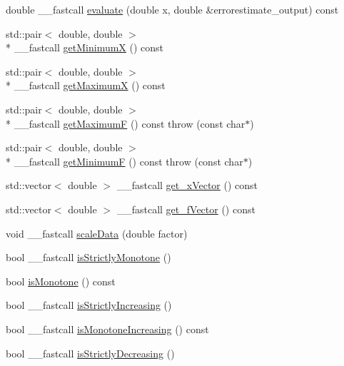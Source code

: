 \begin{DoxyCompactItemize}
\item 
double \+\_\+\+\_\+fastcall \hyperlink{class_monot_cubic_interpolator_aad63f86e674e25fbbaed04a556a80ef6}{evaluate} (double x, double \&errorestimate\+\_\+output) const 
\item 
std\+::pair$<$ double, double $>$\\*
 \+\_\+\+\_\+fastcall \hyperlink{class_monot_cubic_interpolator_a360e0936f3fb3aba30f04c3431dee583}{get\+Minimum\+X} () const 
\item 
std\+::pair$<$ double, double $>$\\*
 \+\_\+\+\_\+fastcall \hyperlink{class_monot_cubic_interpolator_a4f176fc0844759f53f0fbd34dcdd860f}{get\+Maximum\+X} () const 
\item 
std\+::pair$<$ double, double $>$\\*
 \+\_\+\+\_\+fastcall \hyperlink{class_monot_cubic_interpolator_a02050a8bda87e7d046373d672290e090}{get\+Maximum\+F} () const   throw (const char$\ast$)
\item 
std\+::pair$<$ double, double $>$\\*
 \+\_\+\+\_\+fastcall \hyperlink{class_monot_cubic_interpolator_abb3a4d7238087088fe520a6b61445983}{get\+Minimum\+F} () const   throw (const char$\ast$)
\item 
std\+::vector$<$ double $>$ \+\_\+\+\_\+fastcall \hyperlink{class_monot_cubic_interpolator_adb7f87b270ad93c8eb25a8bdbbe82344}{get\+\_\+x\+Vector} () const 
\item 
std\+::vector$<$ double $>$ \+\_\+\+\_\+fastcall \hyperlink{class_monot_cubic_interpolator_a60ae1a75018d1f92938681e78d4a1543}{get\+\_\+f\+Vector} () const 
\item 
void \+\_\+\+\_\+fastcall \hyperlink{class_monot_cubic_interpolator_a4050aca200ad7dfb4c7c34decb5f02fd}{scale\+Data} (double factor)
\item 
bool \+\_\+\+\_\+fastcall \hyperlink{class_monot_cubic_interpolator_a284ed1b74b2b6effae3077c48e90d1eb}{is\+Strictly\+Monotone} ()
\item 
bool \hyperlink{class_monot_cubic_interpolator_a9a403ebce5b791c191e9759cb2de46d6}{is\+Monotone} () const 
\item 
bool \+\_\+\+\_\+fastcall \hyperlink{class_monot_cubic_interpolator_a14bd06b27c82c5605d1a2e2306e035a2}{is\+Strictly\+Increasing} ()
\item 
bool \+\_\+\+\_\+fastcall \hyperlink{class_monot_cubic_interpolator_a0ad22910052b23e0f6d4a69e5d127145}{is\+Monotone\+Increasing} () const 
\item 
bool \+\_\+\+\_\+fastcall \hyperlink{class_monot_cubic_interpolator_a3808c6619217119dddbb293b5ec9cd7b}{is\+Strictly\+Decreasing} ()

\end{DoxyCompactItemize}
